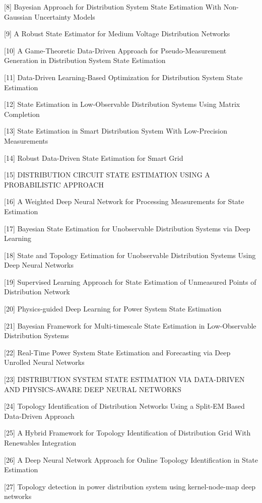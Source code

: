 \documentclass[journal]{IEEEtran}  %
\begin{document}
[8]
Bayesian Approach for Distribution System State Estimation With Non-Gaussian Uncertainty Models

[9]
A Robust State Estimator for Medium Voltage Distribution Networks

[10]
A Game-Theoretic Data-Driven Approach for Pseudo-Measurement Generation in Distribution System State Estimation

[11]
Data-Driven Learning-Based Optimization for Distribution System State Estimation

[12]
State Estimation in Low-Observable Distribution Systems Using Matrix Completion

[13]
State Estimation in Smart Distribution System With Low-Precision Measurements

[14]
Robust Data-Driven State Estimation for Smart Grid

[15]
DISTRIBUTION CIRCUIT STATE ESTIMATION USING A PROBABILISTIC APPROACH

[16]
A Weighted Deep Neural Network for Processing Measurements for State Estimation

[17]
Bayesian State Estimation for Unobservable Distribution Systems via Deep Learning

[18]
State and Topology Estimation for Unobservable Distribution Systems Using Deep Neural Networks

[19]
Supervised Learning Approach for State Estimation of Unmeasured Points of Distribution Network

[20]
Physics-guided Deep Learning for Power System State Estimation

[21]
Bayesian Framework for Multi-timescale State Estimation in Low-Observable Distribution Systems

[22]
Real-Time Power System State Estimation and Forecasting via Deep Unrolled Neural Networks

[23]
DISTRIBUTION SYSTEM STATE ESTIMATION VIA DATA-DRIVEN AND PHYSICS-AWARE DEEP NEURAL NETWORKS

[24]
Topology Identification of Distribution Networks Using a Split-EM Based Data-Driven Approach

[25]
A Hybrid Framework for Topology Identification of Distribution Grid With Renewables Integration

[26]
A Deep Neural Network Approach for Online Topology Identification in State Estimation

[27]
Topology detection in power distribution system using kernel-node-map deep networks
\end{document}
